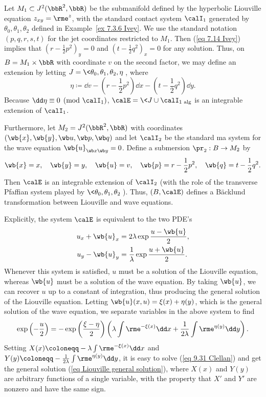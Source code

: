 \begin{example}
    Let $M_1\subset J^2(\bbR^2,\bbR)$ be the submanifold defined by the hyperbolic Liouville equation $z_{xy}=\rme^z$, with the standard contact system $\calI_1$ generated by $\theta_0,\theta_1,\theta_2$ defined in Example~\ref{ex 7.3.6 Ivey}. We use the standard notation $(p,q,r,s,t)$ for the jet coordinates restricted to $M_1$. Then (\ref{eq 7.14 Ivey}) implies that $(r-\frac12p^2)_y=0$ and $(t-\frac12q^2)_x=0$ for any solution. Thus, on $B=M_1\times \bbR$ with coordinate $v$ on the second factor, we may define an extension by letting $J=\<\theta_0,\theta_1,\theta_2,\eta\>$, where 
    \[\eta\coloneqq \dd v-(r-\frac12 p^2)\dd x-(t-\frac12 q^2)\dd y.\]
    Because $\dd\eta\equiv 0\pmod{\calI_1}$, $\calE=\<J\cup\calI_1\>_{\mathrm{alg}}$ is an integrable extension of $\calI_1$.

    Furthermore, let $M_2=J^2(\bbR^2,\bbR)$ with coordinates $(\wb{x},\wb{y},\wb u,\wb p,\wb q)$ and let $\calI_2$ be the standard \gls{ma} system for the wave equation $\wb{u}_{\wb x\wb y}=0$. Define a submersion $\pr_2:B\to M_2$ by 
    \[\wb{x}=x,\quad\wb{y}=y,\quad \wb{u}=v,\quad \wb{p}=r-\frac12 p^2,\quad \wb{q}=t-\frac12 q^2.\]
    Then $\calE$ is an integrable extension of $\calI_2$ (with the role of the transverse Pfaffian system played by $\<\theta_0,\theta_1,\theta_2\>$). Thus, $(B,\calE)$ defines a B\"acklund transformation between Liouville and wave equations.

    Explicitly, the system $\calE$ is equivalent to the two PDE's
    \begin{align}
        u_x+\wb{u}_x&=2\lambda \exp\frac{u-\wb{u}}{2},\\
        u_y-\wb{u}_y&=\frac{1}{\lambda}\exp \frac{u+\wb{u}}{2}.
    \end{align}
    Whenever this system is satisfied, $u$ must be a solution of the Liouville equation, whereas $\wb{u}$ must be a solution of the wave equation. By taking $\wb{u}$, we can recover $u$ up to a constant of integration, thus producing the general solution of the Liouville equation. Letting  $\wb{u}(x,u)=\xi(x)+\eta(y)$, which is the general solution of the wave equation, we separate variables in the above system to find
    \[\exp\left(-\frac{u}{2}\right)=-\exp\left(\frac{\xi-\eta}{2}\right)\left(\lambda\int \rme^{-\xi(x)}\dd x+\frac{1}{2\lambda}\int \rme^{\eta(y)}\dd y\right).\label{eq 9.31 Clellan}\]
    Setting $X(x)\coloneqq -\lambda\int \rme^{-\xi(x)}\dd x$ and $Y(y)\coloneqq -\frac{1}{2\lambda}\int \rme^{\eta(y)}\dd y$, it is easy to solve (\ref{eq 9.31 Clellan}) and get the general solution (\ref{eq Liouville general solution}), where $X(x)$ and $Y(y)$ are arbitrary functions of a single variable, with the property that $X'$ and $Y'$ are nonzero and have the same sign.
\end{example}




